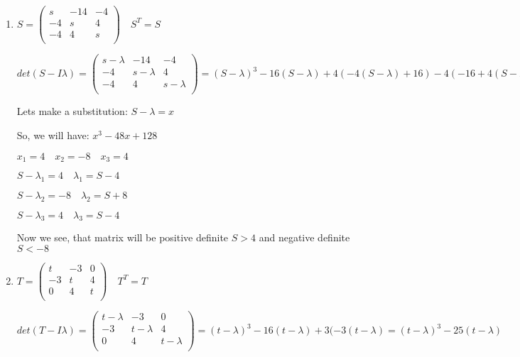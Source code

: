 \documentclass[12pt,letterpaper]{article}
\begin{document}
    \begin{enumerate}[label=(\alph*)]
        \item
        $S = \begin{pmatrix}
            s & -14 & -4 \\
            -4 & s & 4 \\
            -4 & 4 & s \\
        \end{pmatrix}\quad S^T = S$
        
        $det(S - I\lambda) = \begin{pmatrix}
            s - \lambda & -14 & -4 \\
            -4 & s - \lambda & 4 \\
            -4 & 4 & s - \lambda \\
        \end{pmatrix} = (S - \lambda)^3 - 16(S - \lambda) + 4(-4(S-\lambda) + 16) - 4(-16 + 4(S-\lambda)) = (S-\lambda)^3 - 48(S-\lambda) + 128$
        
        Lets make a substitution: $S-\lambda = x$
        
        So, we will have: $x^3 - 48x + 128$
        
        $x_1 = 4\quad x_2 = -8 \quad x_3 = 4$
        
        $S-\lambda_1 = 4\quad \lambda_1 = S-4$
        
        $S-\lambda_2 = -8\quad \lambda_2 = S+8$
        
        $S-\lambda_3 = 4\quad \lambda_3 = S-4$
        
        Now we see, that matrix will be positive definite $S > 4$ and negative definite $S < -8$
        \item
        $T = \begin{pmatrix}
            t & -3 & 0 \\
            -3 & t & 4 \\
            0 & 4 & t \\
        \end{pmatrix}\quad T^T = T$
        
        $det(T - I\lambda) = \begin{pmatrix}
            t - \lambda & -3 & 0 \\
            -3 & t - \lambda & 4 \\
            0 & 4 & t - \lambda \\
        \end{pmatrix} = (t - \lambda)^3 - 16(t - \lambda) + 3(-3(t-\lambda) = (t-\lambda)^3 - 25(t-\lambda)$
        

\end{enumerate}
\end{document}
